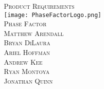 \begin{titlepage}
\begin{center} 
\vspace*{2cm}
\textsc{\Huge Product Requirements}\\[2cm]


\texttt{[image: PhaseFactorLogo.png]}\\[.5cm]
\textsc{\LARGE Phase Factor}\\[3cm]

\textsc{\large Matthew Arendall}\\[0.2cm]
\textsc{\large Bryan DiLaura} \\[0.2cm]
\textsc{\large Ariel Hoffman} \\[0.2cm]
\textsc{\large Andrew Kee} \\[0.2cm]
\textsc{\large Ryan Montoya} \\[0.2cm]
\textsc{\large Jonathan Quinn} \\[0.2cm]

\end{center}
\end{titlepage}